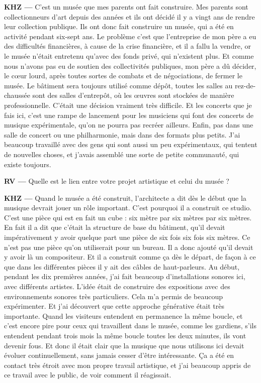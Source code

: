 \documentclass[a4paper,12pt]{article}
\begin{document}
\textbf{KHZ ---} C'est un musée que mes parents ont fait construire. Mes parents sont collectionneurs d'art depuis des années et ils ont décidé il y a vingt ans de rendre leur collection publique. Ils ont donc fait construire un musée, qui a été en activité pendant six-sept ans. Le problème c'est que l'entreprise de mon père a eu des difficultés financières, à cause de la crise financière, et il a fallu la vendre, or le musée n'était entretenu qu'avec des fonds privé, qui n'existent plus. Et comme nous n'avons pas eu de soutien des collectivités publiques, mon père a dû décider, le cœur lourd, après toutes sortes de combats et de négociations, de fermer le musée. Le bâtiment sera toujours utilisé comme dépôt, toutes les salles au rez-de-chaussée sont des salles d'entrepôt, où les œuvres sont stockées de manière professionnelle. C'était une décision vraiment très difficile. Et les concerts que je fais ici, c'est une rampe de lancement pour les musiciens qui font des concerts de musique expérimentale, qu'on ne pourra pas recréer ailleurs. Enfin, pas dans une salle de concert ou une philharmonie, mais dans des formats plus petits. J'ai beaucoup travaillé avec des gens qui sont aussi un peu expérimentaux, qui tentent de nouvelles choses, et j'avais assemblé une sorte de petite communauté, qui existe toujours.

\textbf{RV ---} Quelle est le lien entre votre projet artistique et celui du musée ?

\textbf{KHZ ---} Quand le musée a été construit, l'architecte a dit dès le début que la musique devrait jouer un rôle important. C'est pourquoi il a construit ce studio. C'est une pièce qui est en fait un cube : six mètre par six mètres par six mètres. En fait il a dit que c'était la structure de base du bâtiment, qu'il devait impérativement y avoir quelque part une pièce de six fois six fois six mètres. Ce n'est pas une pièce qu'on utiliserait pour un bureau. Il a donc ajouté qu'il devait y avoir là un compositeur. Et il a construit comme ça dès le départ, de façon à ce que dans les différentes pièces il y ait des câbles de haut-parleurs. Au début, pendant les dix premières années, j'ai fait beaucoup d'installations sonores ici, avec différents artistes. L'idée était de construire des expositions avec des environnements sonores très particuliers. Cela m'a permis de beaucoup expérimenter. Et j'ai découvert que cette approche générative était très importante. Quand les visiteurs entendent en permanence la même boucle, et c'est encore pire pour ceux qui travaillent dans le musée, comme les gardiens, s'ils entendent pendant trois mois la même boucle toutes les deux minutes, ils vont devenir fous. Et donc il était clair que la musique que nous utilisons ici devait évoluer continuellement, sans jamais cesser d'être intéressante. Ça a été en contact très étroit avec mon propre travail artistique, et j'ai beaucoup appris de ce travail avec le public, de voir comment il réagissait.
\end{document}
